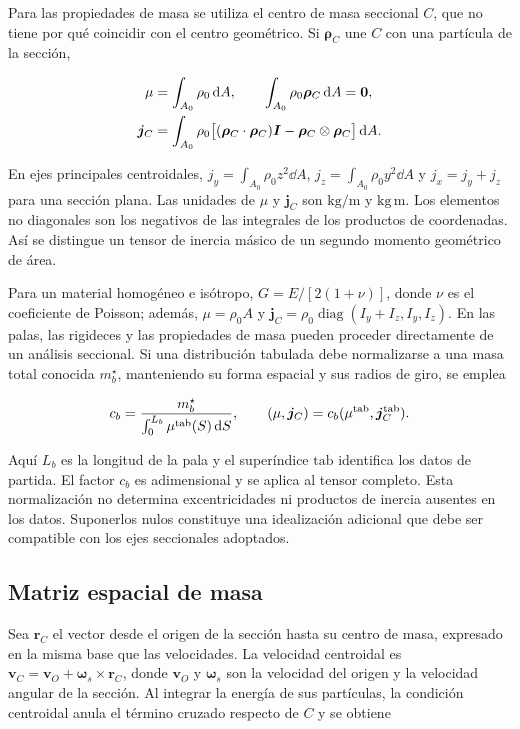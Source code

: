 Para las propiedades de masa se utiliza el centro de masa seccional $C$, que no tiene por qué coincidir con el centro geométrico. Si $\bm\rho_C$ une $C$ con una partícula de la sección,

\begin{align}
\mu&=\int_{A_0}\rho_0\,\mathrm d A,\qquad
\int_{A_0}\rho_0\bm\rho_C\,\mathrm d A=\bm0,\nonumber\\
\bm j_C&=\int_{A_0}\rho_0
\big[(\bm\rho_C\cdot\bm\rho_C)\bm I-\bm\rho_C\otimes\bm\rho_C\big]\,\mathrm d A.
\label{eq:sectioninertia}
\end{align}

En ejes principales centroidales, $j_y=\int_{A_0}\rho_0 z^2\dd A$, $j_z=\int_{A_0}\rho_0 y^2\dd A$ y $j_x=j_y+j_z$ para una sección plana. Las unidades de $\mu$ y $\bm j_C$ son $\mathrm{kg/m}$ y $\mathrm{kg\,m}$. Los elementos no diagonales son los negativos de las integrales de los productos de coordenadas. Así se distingue un tensor de inercia másico de un segundo momento geométrico de área.

Para un material homogéneo e isótropo, $G=E/[2(1+\nu)]$, donde $\nu$ es el coeficiente de Poisson; además, $\mu=\rho_0 A$ y $\bm j_C=\rho_0\operatorname{diag}(I_y+I_z,I_y,I_z)$. En las palas, las rigideces y las propiedades de masa pueden proceder directamente de un análisis seccional. Si una distribución tabulada debe normalizarse a una masa total conocida $m_b^\star$, manteniendo su forma espacial y sus radios de giro, se emplea

\begin{equation}
c_b=\frac{m_b^\star}{\int_0^{L_b}\mu^{\rm tab}(S)\,\mathrm d S},
\qquad (\mu,\bm j_C)=c_b(\mu^{\rm tab},\bm j_C^{\rm tab}).
\label{eq:massscale}
\end{equation}

Aquí $L_b$ es la longitud de la pala y el superíndice $\mathrm{tab}$ identifica los datos de partida. El factor $c_b$ es adimensional y se aplica al tensor completo. Esta normalización no determina excentricidades ni productos de inercia ausentes en los datos. Suponerlos nulos constituye una idealización adicional que debe ser compatible con los ejes seccionales adoptados.

\subsection{Matriz espacial de masa}
Sea $\bm r_C$ el vector desde el origen de la sección hasta su centro de masa, expresado en la misma base que las velocidades. La velocidad centroidal es $\bm v_C=\bm v_O+\bm\omega_s\times\bm r_C$, donde $\bm v_O$ y $\bm\omega_s$ son la velocidad del origen y la velocidad angular de la sección. Al integrar la energía de sus partículas, la condición centroidal anula el término cruzado respecto de $C$ y se obtiene

